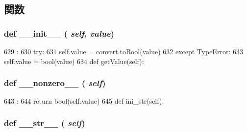 \subsection{関数}
\hypertarget{classm5_1_1params_1_1Bool_ac775ee34451fdfa742b318538164070e}{
\subsubsection[{\_\-\_\-init\_\-\_\-}]{\setlength{\rightskip}{0pt plus 5cm}def \_\-\_\-init\_\-\_\- ( {\em self}, \/   {\em value})}}
\label{classm5_1_1params_1_1Bool_ac775ee34451fdfa742b318538164070e}



\begin{DoxyCode}
629                              :
630         try:
631             self.value = convert.toBool(value)
632         except TypeError:
633             self.value = bool(value)
634 
    def getValue(self):
\end{DoxyCode}
\hypertarget{classm5_1_1params_1_1Bool_a14f4a7f4cbfde7254adc73da3b2de9a5}{
\subsubsection[{\_\-\_\-nonzero\_\-\_\-}]{\setlength{\rightskip}{0pt plus 5cm}def \_\-\_\-nonzero\_\-\_\- ( {\em self})}}
\label{classm5_1_1params_1_1Bool_a14f4a7f4cbfde7254adc73da3b2de9a5}



\begin{DoxyCode}
643                          :
644         return bool(self.value)
645 
    def ini_str(self):
\end{DoxyCode}
\hypertarget{classm5_1_1params_1_1Bool_aa7a4b9bc0941308e362738503137460e}{
\subsubsection[{\_\-\_\-str\_\-\_\-}]{\setlength{\rightskip}{0pt plus 5cm}def \_\-\_\-str\_\-\_\- ( {\em self})}}
\label{classm5_1_1params_1_1Bool_aa7a4b9bc0941308e362738503137460e}



